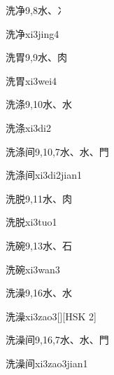 \begin{entry}{洗净}{9,8}{⽔、⼎}
  \begin{phonetics}{洗净}{xi3jing4}
  \end{phonetics}
\end{entry}

\begin{entry}{洗胃}{9,9}{⽔、⾁}
  \begin{phonetics}{洗胃}{xi3wei4}
  \end{phonetics}
\end{entry}

\begin{entry}{洗涤}{9,10}{⽔、⽔}
  \begin{phonetics}{洗涤}{xi3di2}
  \end{phonetics}
\end{entry}

\begin{entry}{洗涤间}{9,10,7}{⽔、⽔、⾨}
  \begin{phonetics}{洗涤间}{xi3di2jian1}
  \end{phonetics}
\end{entry}

\begin{entry}{洗脱}{9,11}{⽔、⾁}
  \begin{phonetics}{洗脱}{xi3tuo1}
  \end{phonetics}
\end{entry}

\begin{entry}{洗碗}{9,13}{⽔、⽯}
  \begin{phonetics}{洗碗}{xi3wan3}
  \end{phonetics}
\end{entry}

\begin{entry}{洗澡}{9,16}{⽔、⽔}
  \begin{phonetics}{洗澡}{xi3zao3}[][HSK 2]
  \end{phonetics}
\end{entry}

\begin{entry}{洗澡间}{9,16,7}{⽔、⽔、⾨}
  \begin{phonetics}{洗澡间}{xi3zao3jian1}
  \end{phonetics}
\end{entry}

